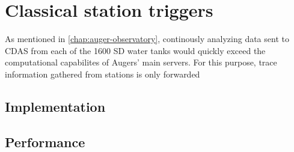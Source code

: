 
\chapter{Classical station triggers}
\label{chap:classical-triggers}

As mentioned in \autoref{chap:auger-observatory}, continously analyzing data sent to CDAS from each of the 1600 SD water tanks would quickly exceed the 
computational capabilites of Augers' main servers. For this purpose, trace information gathered from stations is only forwarded 

\section{Implementation}
\label{sec:hardware-triggers-implementation}

\section{Performance}
\label{sec:hardware-triggers-performance}




